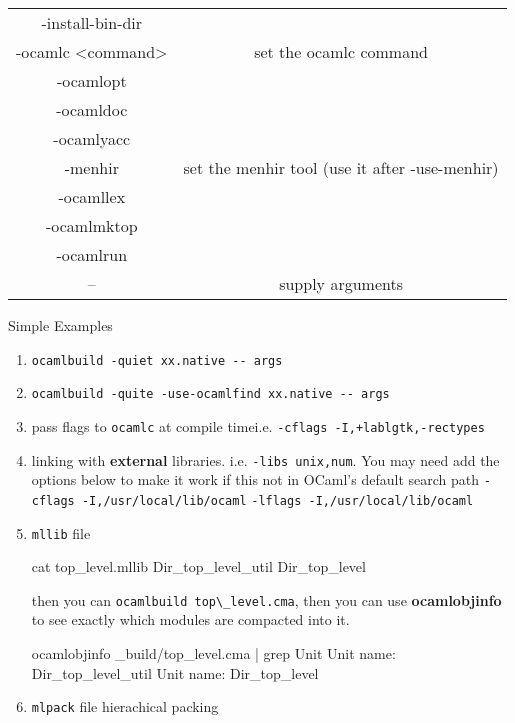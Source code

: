 \begin{spacing}{0.5}
\begin{tabular}{|c|c|}
-install-bin-dir & \\
-ocamlc <command> & set the ocamlc command \\
-ocamlopt  & \\
-ocamldoc & \\
-ocamlyacc & \\
-menhir & set the menhir tool (use it after -use-menhir)\\
-ocamllex & \\
-ocamlmktop & \\
-ocamlrun & \\
-- & supply arguments \\
\hline
  \end{tabular}
\end{spacing}

Simple Examples

\begin{enumerate}
\item \verb|ocamlbuild -quiet xx.native -- args|
\item \verb|ocamlbuild -quite -use-ocamlfind xx.native -- args|

\item   pass flags to \verb|ocamlc|  at compile timei.e.   
  \verb|-cflags -I,+lablgtk,-rectypes|

\item linking with \textbf{ external} libraries. i.e.
  \verb|-libs unix,num|.  You may need add the options below to make
  it work if this not in OCaml's default search path
  \verb|-cflags -I,/usr/local/lib/ocaml|
  \verb|-lflags -I,/usr/local/lib/ocaml|


\item \verb|mllib| file

  \begin{bluetext}
cat top_level.mllib    
Dir_top_level_util
Dir_top_level  
\end{bluetext}

then you can \verb|ocamlbuild top\_level.cma|, then you can use
\textbf{ocamlobjinfo} to see exactly which modules are compacted into
it.

\begin{bluetext}
ocamlobjinfo _build/top_level.cma | grep Unit  
Unit name: Dir_top_level_util
Unit name: Dir_top_level
\end{bluetext}

\item \verb|mlpack| file 
  hierachical packing 
\end{enumerate}

